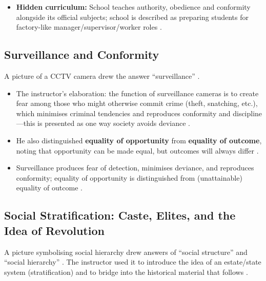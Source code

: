 \begin{QuickRevision}
\begin{itemize}
    \item \textbf{Hidden curriculum:} School teaches authority, obedience and conformity alongside its official subjects; school is described as preparing students for factory-like manager/supervisor/worker roles .
\end{itemize}
\end{QuickRevision}

\subsection{Surveillance and Conformity}
A picture of a CCTV camera drew the answer ``surveillance'' .

\begin{CriticalPoint}
\begin{itemize}
    \item The instructor's elaboration: the function of surveillance cameras is to create fear among those who might otherwise commit crime (theft, snatching, etc.), which minimises criminal tendencies and reproduces conformity and discipline---this is presented as one way society avoids deviance .
    \item He also distinguished \textbf{equality of opportunity} from \textbf{equality of outcome}, noting that opportunity can be made equal, but outcomes will always differ .
\end{itemize}
\end{CriticalPoint}

\begin{QuickRevision}
\begin{itemize}
    \item Surveillance produces fear of detection, minimises deviance, and reproduces conformity; equality of opportunity is distinguished from (unattainable) equality of outcome .
\end{itemize}
\end{QuickRevision}

\subsection{Social Stratification: Caste, Elites, and the Idea of Revolution}
A picture symbolising social hierarchy drew answers of ``social structure'' and ``social hierarchy'' . The instructor used it to introduce the idea of an estate/state system (stratification) and to bridge into the historical material that follows .

